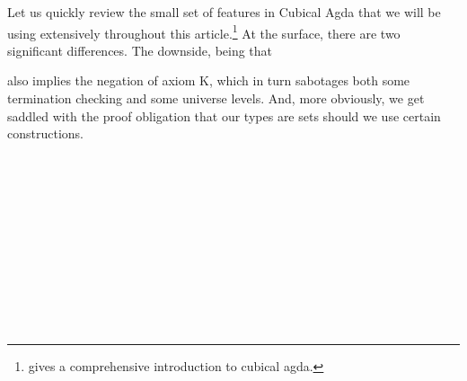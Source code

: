 \documentclass[../Main.tex]{subfiles}
\begin{document}
Let us quickly review the small set of features in Cubical Agda that we will be using extensively throughout this article.\footnote{\cite{cuagda} gives a comprehensive introduction to cubical agda.} At the surface, there are two significant differences. The downside, being that 
\begin{code}%
\>[0]\AgdaSymbol{\{-\#}\AgdaSpace{}%
\AgdaSpace{}%
\AgdaSpace{}%
\AgdaSymbol{\#-\}}\<%
\end{code}
also implies the negation of axiom K, which in turn sabotages both some termination checking and some universe levels. And, more obviously, we get saddled with the proof obligation that our types are sets should we use certain constructions.

\begin{code}[hide]%
\>[0]\AgdaSpace{}%
\AgdaSpace{}%
\<%
\\
%
\\[\AgdaEmptyExtraSkip]%
\>[0]\AgdaSpace{}%
\AgdaSpace{}%
\AgdaSpace{}%
\AgdaSpace{}%
\AgdaSymbol{(}\AgdaSymbol{;}\AgdaSpace{}%
\AgdaSymbol{)}\<%
\\
\>[0]\AgdaSpace{}%
\AgdaSpace{}%
\<%
\\
\>[0]\AgdaSpace{}%
\AgdaSpace{}%
\<%
\\
\>[0]\AgdaSpace{}%
\AgdaSpace{}%
\AgdaSpace{}%
\<%
\\
%
\\[\AgdaEmptyExtraSkip]%
\>[0]\AgdaSpace{}%
\<%
\\
\>[0][@{}l@{\AgdaIndent{0}}]%
\>[4]\AgdaSpace{}%
\AgdaSpace{}%
\AgdaSymbol{:}\AgdaSpace{}%
\<%
\\
%
\>[4]\AgdaSpace{}%
\AgdaSpace{}%
\AgdaSymbol{:}\AgdaSpace{}%
\<%
\\
%
\>[4]\AgdaSpace{}%
\AgdaSpace{}%
\AgdaSymbol{:}\AgdaSpace{}%
\AgdaSpace{}%
\AgdaSpace{}%
\<%
\end{code}
\end{document}
